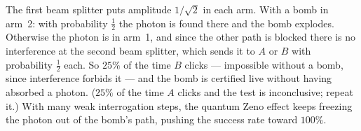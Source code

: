  The first beam splitter puts amplitude $1/\sqrt2$ in each arm. With a bomb in arm~2: with probability $\tfrac12$ the photon is found there and the bomb explodes. Otherwise the photon is in arm~1, and since the other path is blocked there is no interference at the second beam splitter, which sends it to $A$ or $B$ with probability $\tfrac12$ each. So $25\%$ of the time $B$ clicks --- impossible without a bomb, since interference forbids it --- and the bomb is certified live without having absorbed a photon. ($25\%$ of the time $A$ clicks and the test is inconclusive; repeat it.) With many weak interrogation steps, the quantum Zeno effect keeps freezing the photon out of the bomb's path, pushing the success rate toward $100\%$.
